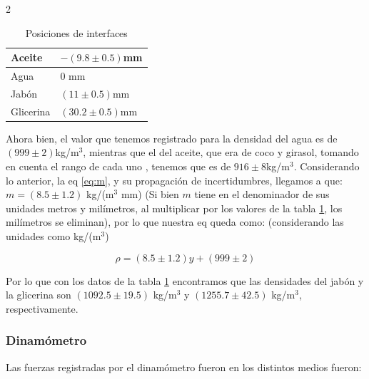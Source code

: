 \documentclass[10pt,letterpaper]{article}
\begin{document}
\begin{multicols}{2}
    \begin{table}[H] 
    \caption{\label{tab1} Posiciones de interfaces} 
       \begin{center}
       \begin{tabular}{|p{2cm}|p{3cm}|}
       \hline
        Aceite & $- (9.8 \pm 0.5)$mm \\
       \hline
        Agua & $0$ mm\\
       \hline
        Jabón & $(11 \pm 0.5)$mm \\
        \hline
        Glicerina & $(30.2 \pm 0.5)$mm \\
        \hline
       \end{tabular}
       \end{center}
    \end{table}

    Ahora bien, el valor que tenemos registrado para la densidad del
    agua es de $(999 \pm 2)$kg/m$^3$, mientras que el del aceite, que
    era de coco y girasol, tomando en cuenta el rango de cada uno \cite{aceite}, tenemos que es de $916 \pm 8$kg/m$^3$. Considerando lo anterior, la eq \ref{eq:m}, y su propagación de incertidumbres, llegamos a que: $m = (8.5 \pm 1.2)$ kg/(m$^3$ mm) (Si bien $m$ tiene en el denominador de sus unidades metros y milímetros, al multiplicar por los valores de la tabla \ref{tab1}, los milímetros se eliminan), por lo que nuestra eq queda como: (considerando las unidades como kg/(m$^3$)
    
    \begin{equation}
        \label{eq:lindens}
        \rho = (8.5 \pm 1.2) y +  (999 \pm 2)
    \end{equation}

    Por lo que con los datos de la tabla \ref{tab1} encontramos que las densidades del jabón y la glicerina son $(1092.5 \pm 19.5)$ kg/m$^3$ y
    $(1255.7 \pm 42.5)$ kg/m$^3$, respectivamente.






    \subsubsection{Dinamómetro}

    Las fuerzas registradas por el dinamómetro fueron en los distintos medios fueron:


\end{multicols}
\end{document}
